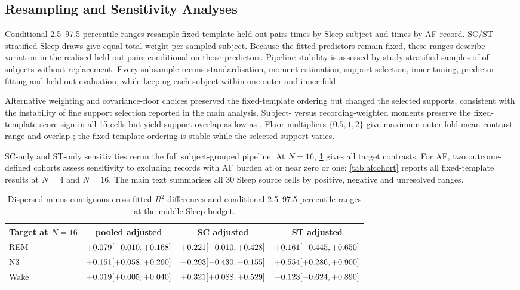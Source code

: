 \subsection{Resampling and Sensitivity Analyses}
\label{sec:appendix-real-sensitivity}

Conditional 2.5--97.5 percentile ranges resample fixed-template held-out pairs
\numSleepFixedRangeResamples{} times by Sleep subject and
\numAfFixedRangeResamples{} times by AF record. SC/ST-stratified Sleep draws give
equal total weight per sampled subject. Because the fitted predictors remain
fixed, these ranges describe variation in the realised held-out pairs
conditional on those predictors. Pipeline stability is
assessed by \numSelectionSubsampleReps{} study-stratified samples of
\numSelectionSubsamplePct{} of subjects without replacement. Every subsample
reruns standardisation, moment estimation, support selection, inner tuning,
predictor fitting and held-out evaluation, while keeping each subject within
one outer and inner fold.

Alternative weighting and covariance-floor choices preserved the fixed-template ordering but changed the selected supports, consistent with the instability of fine support selection reported in the main analysis. Subject- versus recording-weighted moments preserve the fixed-template
score sign in all 15 cells but yield support overlap as low as
\numBalanceFineJaccardMin. Floor multipliers $\{0.5,1,2\}$ give maximum
outer-fold mean contrast range \numFloorCoarseSpread{} and overlap
\numFloorFineJaccardMin; the fixed-template ordering is stable while the
selected support varies.

SC-only and ST-only sensitivities rerun the full subject-grouped pipeline.
At $N=16$, \cref{tab:sleep-sensitivity} gives all target contrasts. For AF,
two outcome-defined cohorts assess sensitivity to excluding records with AF
burden at or near zero or one;
\cref{tab:afcohort} reports all fixed-template results at $N=4$ and $N=16$.
The main text summarises all 30 Sleep source cells by positive, negative and
unresolved ranges.

\begin{table}[H]
\centering\footnotesize
\setlength{\tabcolsep}{4pt}
\begin{tabular}{@{}lccc@{}}
\toprule
Target at $N=16$ & pooled adjusted & SC adjusted & ST adjusted \\
\midrule
REM & $+0.079 [-0.010, +0.168]$ & $+0.221 [-0.010, +0.428]$ & $+0.161 [-0.445, +0.650]$ \\
N3 & $+0.151 [+0.058, +0.290]$ & $-0.293 [-0.430, -0.155]$ & $+0.554 [+0.286, +0.900]$ \\
Wake & $+0.019 [+0.005, +0.040]$ & $+0.321 [+0.088, +0.529]$ & $-0.123 [-0.624, +0.890]$ \\
\bottomrule
\end{tabular}
\caption{Dispersed-minus-contiguous cross-fitted $R^2$ differences and
conditional 2.5--97.5 percentile ranges at the middle Sleep budget.}
\label{tab:sleep-sensitivity}
\end{table}

